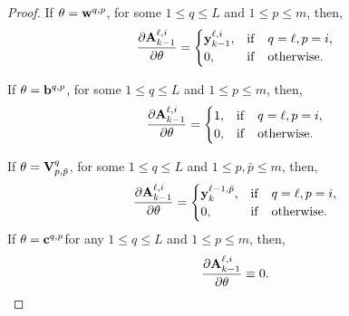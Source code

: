 \documentclass{article}
\newcommand{\by}{{\bf y}}
\newcommand{\bw}{{\bf w}}
\newcommand{\bb}{{\bf b}}
\newcommand{\bV}{{\bf V}}
\newcommand{\bA}{{\bf A}}
\newcommand{\bc}{{\bf c}}
\begin{document}
\begin{proof}
If $\theta = \bw^{q,p}$, for some $1\leq q \leq L$ and $1 \leq p \leq m$, then,
\begin{equation}
    \label{eq:p3}
    \frac{\partial \bA^{\ell,i}_{k-1}}{\partial \theta} =\begin{cases} 
    \by^{\ell,i}_{k-1}, &{\rm if}\quad q=\ell, p=i, \\
    0, &{\rm if}\quad {\rm otherwise}.
     \end{cases}
\end{equation}

If $\theta = \bb^{q,p}$, for some $1\leq q \leq L$ and $1 \leq p \leq m$, then,
\begin{equation}
    \label{eq:p4}
    \frac{\partial \bA^{\ell,i}_{k-1}}{\partial \theta} =\begin{cases} 
    1, &{\rm if}\quad q=\ell, p=i, \\
    0, &{\rm if}\quad {\rm otherwise}.
     \end{cases}
\end{equation}

If $\theta = \bV^{q}_{p,\bar{p}}$, for some $1\leq q \leq L$ and $1 \leq p,\bar{p} \leq m$, then,
\begin{equation}
    \label{eq:p5}
    \frac{\partial \bA^{\ell,i}_{k-1}}{\partial \theta} =\begin{cases} 
    \by^{\ell-1,\bar{p}}_{k}, &{\rm if}\quad q=\ell, p=i, \\
    0, &{\rm if}\quad {\rm otherwise}.
     \end{cases}
\end{equation}
If $\theta = \bc^{q,p}$for any $1\leq q \leq L$ and $1 \leq p \leq m$, then,
\begin{equation}
    \label{eq:p6}
\frac{\partial \bA^{\ell,i}_{k-1}}{\partial \theta} \equiv 0.
\end{equation}


\end{proof}
\end{document}
